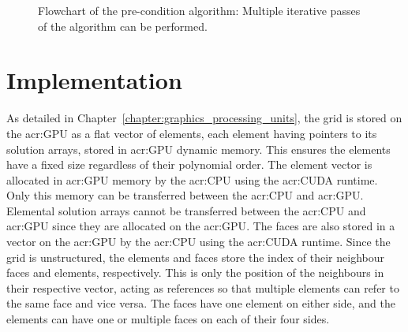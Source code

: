 \begin{figure}[H]
    \centering
    \caption{Flowchart of the pre-condition algorithm: Multiple iterative passes of the algorithm can be performed.}\label{fig:pre-condition_flowchart}
\end{figure}



\section{Implementation}\label{section:adaptive_mesh_refinement:implementation}

As detailed in Chapter~\ref{chapter:graphics_processing_units}, the grid is stored on the
\acrshort{acr:GPU} as a flat vector of elements, each element having pointers to its solution
arrays, stored in \acrshort{acr:GPU} dynamic memory. This ensures the elements have a fixed size
regardless of their polynomial order. The element vector is allocated in \acrshort{acr:GPU} memory
by the \acrshort{acr:CPU} using the \acrshort{acr:CUDA} runtime. Only this memory can be transferred
between the \acrshort{acr:CPU} and \acrshort{acr:GPU}. Elemental solution arrays cannot be
transferred between the \acrshort{acr:CPU} and \acrshort{acr:GPU} since they are allocated on the
\acrshort{acr:GPU}. The faces are also stored in a vector on the \acrshort{acr:GPU} by the
\acrshort{acr:CPU} using the \acrshort{acr:CUDA} runtime. Since the grid is unstructured, the
elements and faces store the index of their neighbour faces and elements, respectively. This is only
the position of the neighbours in their respective vector, acting as references so that multiple
elements can refer to the same face and vice versa. The faces have one element on either side, and
the elements can have one or multiple faces on each of their four sides.

